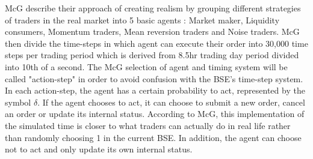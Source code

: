 McG describe their approach of creating realism by grouping different strategies of traders in the real market into 5 basic agents : Market maker, Liquidity consumers, Momentum traders, Mean reversion traders and Noise traders. McG then divide the time-steps in which agent can execute their order into 30,000 time steps per trading period which is derived from 8.5hr trading day period divided into 10th of a second. The McG selection of agent and timing system will be called "action-step" in order to avoid confusion with the BSE's time-step system. In each action-step, the agent has a certain probability to act, represented by the symbol $\delta$. If the agent chooses to act, it can choose to submit a new order, cancel an order or update its internal status. According to McG, this implementation of the simulated time is closer to what traders can actually do in real life rather than randomly choosing 1 in the current BSE. In addition, the agent can choose not to act and only update its own internal status.




